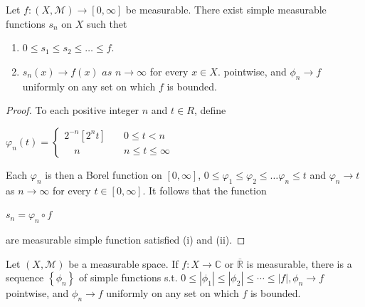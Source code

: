 \documentclass[12pt, a4paper, oneside]{book}
\begin{document}
\begin{theorem}
    \label{thm: convergence pointwise by simple function}
    Let $f:\left(X,\mathcal{M}\right)\rightarrow[0,\infty]$ be measurable. There exist simple measurable functions $s_n$ on $X$ such thet
    \begin{enumerate}[label=(\roman*)]
        \item
              $0\leq s_1\leq s_2\leq \ldots \leq f.$
        \item
              $s_{n}( x) \to f( x)$ $as$ $n\to \infty$  for every $x\in X.$  pointwise, and $\phi_n \rightarrow f$ uniformly on any set on which $f$ is bounded.
    \end{enumerate}
    \begin{proof}
        To each positive integer $n$ and $t\in R$, define
        \begin{center}
            $\varphi_n(t)=
                \begin{cases}
                    2^{-n}[2^nt] & \quad 0\leq t < n         \\
                    \quad n      & \quad n\leq t \leq \infty
                \end{cases}$
        \end{center}
        Each $\varphi_n$ is then a Borel function on $[0,\infty]$, $0\leq \varphi_1\leq\varphi_2\leq\ldots\varphi_n\leq t$ and $\varphi_n\to t$ as $n\to \infty$ for every $t\in [0,\infty]$. It
        follows that the function
        \begin{center}
            $s_n=\varphi_n\circ f$
        \end{center}
        are measurable simple function satisfied (i) and (ii).
    \end{proof}
\end{theorem}

\begin{corollary}
    Let $(X, \mathcal{M})$ be a measurable space.
    If $f: X \rightarrow \mathbb{C}$ or $\overline{\mathbb{R}}$ is measurable, there is a sequence $\left\{\phi_n\right\}$ of simple functions s.t. $0 \leq\left|\phi_1\right| \leq\left|\phi_2\right| \leq \cdots \leq|f|, \phi_n \rightarrow f$ pointwise, and $\phi_n \rightarrow f$ uniformly on any set on which $f$ is bounded.
\end{corollary}
\end{document}
